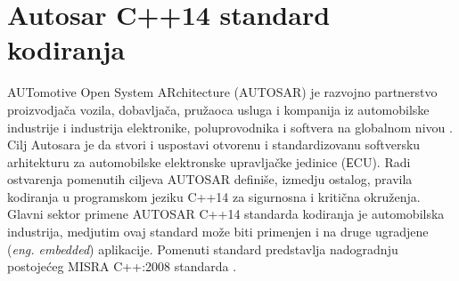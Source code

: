 \documentclass[12pt,oneside]{memoir}
\begin{document}







\chapter{Autosar C++14 standard kodiranja}
\label{chp:autosar}

AUTomotive Open System ARchitecture (AUTOSAR) je razvojno partnerstvo proizvodjača vozila, dobavljača, pružaoca usluga i kompanija iz automobilske industrije i industrija elektronike, poluprovodnika i softvera na globalnom nivou \cite{AutosarWebsite}. 
Cilj Autosara je da stvori i uspostavi otvorenu i standardizovanu softversku arhitekturu za automobilske elektronske upravljačke jedinice (ЕCU).
Radi ostvarenja pomenutih ciljeva AUTOSAR definiše, izmedju ostalog, pravila kodiranja u programskom jeziku C++14 za sigurnosna i kritična okruženja. Glavni sektor primene AUTOSAR C++14 standarda kodiranja je automobilska industrija, medjutim ovaj standard može biti primenjen
i na druge ugradjene (\textit{eng. embedded}) aplikacije. Pomenuti standard predstavlja nadogradnju postojećeg MISRA C++:2008 standarda \cite{AutosarGuidelines}.
\end{document}
